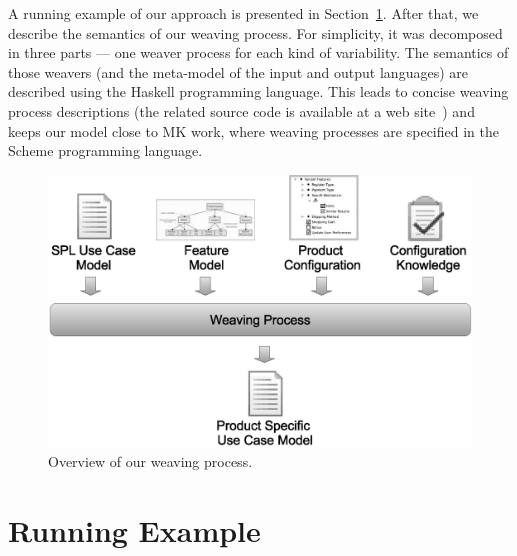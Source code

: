 \documentclass[11pt]{report}
\begin{document}
A running example of our approach is presented in Section~\ref{sub:running}.
After that, we describe the semantics of our weaving process. For simplicity, it
was decomposed in three parts --- one weaver process for each kind of
variability.  The semantics of those weavers (and the meta-model of the input and
output languages) are described using the Haskell programming
language. This leads to concise weaving process
descriptions (the related source code is available at a web site~\cite{spg-url})
and keeps our model close to MK work, where weaving processes are specified in
the Scheme programming language. 

 

\begin{figure}[h]
 \begin{center}
  \includegraphics[scale=0.35]{img/weave-process2.eps}
   \caption{Overview of our weaving process.}
  \label{fig:weave-process}
  \end{center}
\end{figure}

\section{Running Example}
\label{sub:running}
\end{document}
